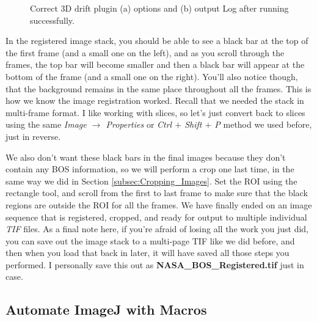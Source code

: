 \documentclass[letterpaper,12pt]{article}
\begin{document}
\begin{figure}[h]
    \caption{Correct 3D drift plugin (a) options and (b) output Log after running successfully.}
    \label{fig:Correct_3D_drift}
\end{figure}

In the registered image stack, you should be able to see a black bar at the top of the first frame (and a small one on the left), and as you scroll through the frames, the top bar will become smaller and then a black bar will appear at the bottom of the frame (and a small one on the right).  You'll also notice though, that the background remains in the same place throughout all the frames.  This is how we know the image registration worked.  Recall that we needed the stack in multi-frame format.  I like working with slices, so let's just convert back to slices using the same \textcolor{myMagenta}{\textit{Image $\rightarrow$ Properties}} or \textit{Ctrl $+$ Shift $+$ P} method we used before, just in reverse.

We also don't want these black bars in the final images because they don't contain any BOS information, so we will perform a crop one last time, in the same way we did in Section \ref{subsec:Cropping_Images}.  Set the ROI using the rectangle tool, and scroll from the first to last frame to make sure that the black regions are outside the ROI for all the frames.  We have finally ended on an image sequence that is registered, cropped, and ready for output to multiple individual \textit{TIF} files.  As a final note here, if you're afraid of losing all the work you just did, you can save out the image stack to a multi-page TIF like we did before, and then when you load that back in later, it will have saved all those steps you performed.  I personally save this out as \textbf{NASA\_BOS\_Registered.tif} just in case.

\subsection{Automate ImageJ with Macros}
\label{subsec:Automate_ImageJ_with_Macros}
\end{document}
